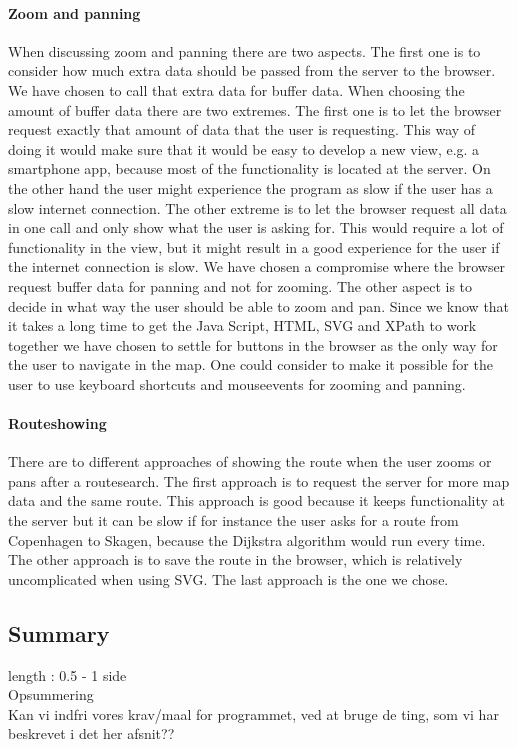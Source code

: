 \documentclass[a4paper,10pt,titlepage]{article}
\begin{document}
\paragraph{Zoom and panning}
When discussing zoom and panning there are two aspects. The first one is to consider how much extra data should be passed from the server to the browser. We have chosen to call that extra data for buffer data. When choosing the amount of buffer data there are two extremes. The first one is to let the browser request exactly that amount of data that the user is requesting. This way of doing it would make sure that it would be easy to develop a new view, e.g. a smartphone app, because most of the functionality is located at the server. On the other hand the user might experience the program as slow if the user has a slow internet connection. The other extreme is to let the browser request all data in one call and only show what the user is asking for. This would require a lot of functionality in the view, but it might result in a good experience for the user if the internet connection is slow. We have chosen a compromise where the browser request buffer data for panning and not for zooming.
The other aspect is to decide in what way the user should be able to zoom and pan. Since we know that it takes a long time to get the Java Script, HTML, SVG and XPath to work together we have chosen to settle for buttons in the browser as the only way for the user to navigate in the map. One could consider to make it possible for the user to use keyboard shortcuts and mouseevents for zooming and panning. 

\paragraph{Routeshowing}
There are to different approaches of showing the route when the user zooms or pans after a routesearch. The first approach is to request the server for more map data and the same route. This approach is good because it keeps functionality at the server but it can be slow if for instance the user asks for a route from Copenhagen to Skagen, because the Dijkstra algorithm would run every time. The other approach is to save the route in the browser, which is relatively uncomplicated when using SVG. The last approach is the one we chose.	

				
				
		\subsection{Summary}
			length : 0.5 - 1 side\\
			Opsummering\\
			Kan vi indfri vores krav/maal for programmet, ved at bruge de ting, som vi har beskrevet i det her afsnit??\\
			
\end{document}
